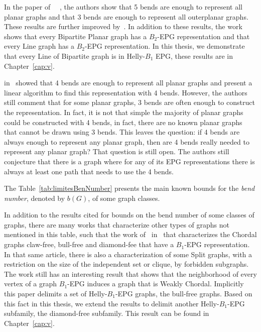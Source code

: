 In the paper of ~\citeauthor{biedl2010}~\cite{biedl2010}, the authors show that 5 bends are enough to represent all planar graphs and that 3 bends are enough to represent all outerplanar graphs. These results are further improved by~\cite{daniel2014b}. In addition to these results, the work shows that every Bipartite Planar graph has a $B_2$-EPG representation and that every Line graph has a $B_2$-EPG representation. In this thesis, we demonstrate that every Line of Bipartite graph is in Helly-$B_1$ EPG, these results are in Chapter~\ref{cap:v}.

\citeauthor{daniel2014b} in~\cite{daniel2014b} showed that 4 bends are enough to represent all planar graphs and present a linear algorithm to find this representation with 4 bends. However, the authors still comment that for some planar graphs, 3 bends are often enough to construct the representation. In fact, it is not that simple the majority of planar graphs could be constructed with 4 bends, in fact, there are no known planar graphs that cannot be drawn using 3 bends. This leaves the question: if 4 bends are always enough to represent any planar graph, then are 4 bends really needed to represent any planar graph? That question is still open. The authors still conjecture that there is a graph where for any of its EPG representations there is always at least one path that needs to use the 4 bends.


The Table~\ref{tab:limitesBenNumber} presents the main known bounds for the \emph{bend number}, denoted by $b(G)$, of some graph classes.





In addition to the results cited for bounds on the bend number of some classes of graphs, there are many works that characterize other types of graphs not mentioned in this table, such that the work of~\citeauthor{ries2009} in~\citep{ries2009} that characterizes the Chordal graphs  claw-free, bull-free and diamond-fee that have a $ B_{1}$-EPG representation. In that same article, there is also a characterization of some Split graphs, with a restriction on the size of the independent set or  clique, by forbidden subgraphs. The work still has an interesting result that shows that the neighborhood of every vertex of a graph $ B_1$-EPG induces a graph that is Weakly Chordal. Implicitly this paper delimits a set of Helly-$B_1$-EPG graphs, the bull-free graphs. Based on this fact in this thesis, we extend the results to delimit another Helly-$B_1$-EPG subfamily, the diamond-free subfamily. This result can be found in Chapter~\ref{cap:v}.

